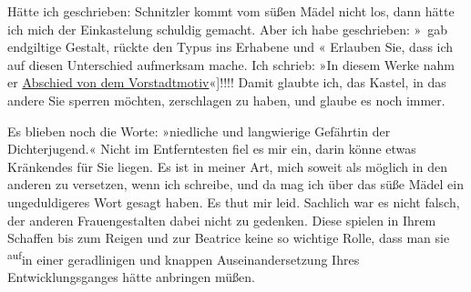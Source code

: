 \pstart
           Hätte ich geschrieben: Schnitzler kommt vom süßen Mädel nicht los, dann hätte ich
               mich der Einkastelung schuldig gemacht. Aber ich habe {\pb}geschrieben: »{\dotsfive} gab endgiltige Gestalt, rückte den Typus ins Erhabene
                  und « Erlauben Sie, dass ich auf diesen Unterschied aufmerksam mache. Ich schrieb:
                  »In diesem Werke nahm er \uline{Abschied von dem Vorstadtmotiv}\pwindex{Arthur Schnitzler und sein »Reigen«@\emph{Arthur Schnitzler und sein »Reigen«}|pwv}{[}«{]}!!!! Damit glaubte ich, das Kastel, in das andere Sie sperren
               möchten, zerschlagen zu haben, und glaube es noch immer.\pend
           
\pstart
           Es blieben noch die Worte: »niedliche und langwierige Gefährtin der Dichterjugend.« Nicht im
               Entferntesten fiel es mir ein, darin könne etwas Kränkendes für Sie liegen. Es ist in
               meiner Art, mich soweit als möglich in den anderen zu versetzen, wenn ich schreibe,
               und da mag ich über das süße Mädel ein ungeduldigeres Wort gesagt haben. Es thut mir
               leid. Sachlich war es nicht falsch, der anderen Frauengestalten dabei nicht zu
               gedenken. Diese spielen in Ihrem Schaffen bis zum Reigen und zur Beatrice keine so
               wichtige Rolle, dass man sie \substVorne{}\textsuperscript{auf}\substDazwischen{}in\substHinten{} einer geradlinigen und knappen Auseinandersetzung Ihres Entwicklungsganges
               hätte anbringen müßen.\pend
           
